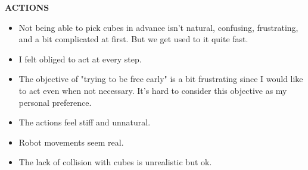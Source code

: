 \textbf{ACTIONS}
\begin{itemize}
\setlength\itemsep{-0.3em}
\item Not being able to pick cubes in advance isn't natural, confusing, frustrating, and a bit complicated at first. But we get used to it quite fast.
\item I felt obliged to act at every step.
\item The objective of "trying to be free early" is a bit frustrating since I would like to act even when not necessary. It's hard to consider this objective as my personal preference.
\item The actions feel stiff and unnatural.
\item Robot movements seem real.
\item The lack of collision with cubes is unrealistic but ok.
\end{itemize}

